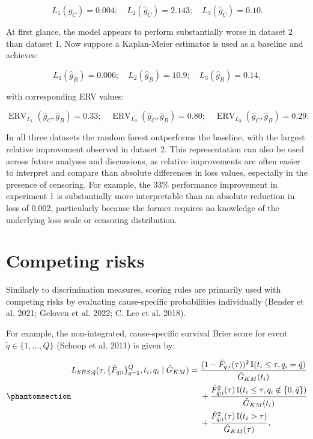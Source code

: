 \documentclass[
  letterpaper,
  krantz2]{style/krantz}
\begin{document}
\[
L_1(\hat{g}_C) = 0.004; \quad L_2(\hat{g}_C) = 2.143; \quad L_3(\hat{g}_C) = 0.10.
\]

At first glance, the model appears to perform substantially worse in
dataset 2 than dataset 1. Now suppose a Kaplan-Meier estimator is used
as a baseline and achieves:

\[
L_1(\hat{g}_B) = 0.006; \quad L_2(\hat{g}_B) = 10.9; \quad L_3(\hat{g}_B) = 0.14,
\]

with corresponding ERV values:

\[
\operatorname{ERV}_{L_1}(\hat{g}_C, \hat{g}_B) = 0.33; \quad \operatorname{ERV}_{L_2}(\hat{g}_C, \hat{g}_B) = 0.80; \quad \operatorname{ERV}_{L_3}(\hat{g}_C, \hat{g}_B) = 0.29.
\]

In all three datasets the random forest outperforms the baseline, with
the largest relative improvement observed in dataset 2. This
representation can also be used across future analyses and discussions,
as relative improvements are often easier to interpret and compare than
absolute differences in loss values, especially in the presence of
censoring. For example, the \(33\%\) performance improvement in
experiment 1 is substantially more interpretable than an absolute
reduction in loss of \(0.002\), particularly because the former requires
no knowledge of the underlying loss scale or censoring distribution.

\section{Competing risks}\label{sec-rules-ext}

Similarly to discrimination measures, scoring rules are primarily used
with competing risks by evaluating cause-specific probabilities
individually (Bender et al. 2021; Geloven et al. 2022; C. Lee et al.
2018).

For example, the non-integrated, cause-specific survival Brier score for
event \(\tilde{q} \in \{1, \ldots, Q\}\) (Schoop et al. 2011) is given
by:

\begin{equation}\phantomsection\label{eq-sbs-cs}{
\begin{aligned}
L_{SBS;\tilde{q}}(\tau, \{\hat{F}_{q;i}\}^Q_{q=1}, t_i, q_i \mid \hat{G}_{KM}) = {} & \frac{(1 - \hat{F}_{\tilde{q};i}(\tau))^2 \, \mathbb{I}(t_i \leq \tau, q_i = \tilde{q})}{\hat{G}_{KM}(t_i)} \\
& + \frac{\hat{F}_{\tilde{q};i}^2(\tau) \, \mathbb{I}(t_i \leq \tau, q_i \notin \{0, \tilde{q}\})}{\hat{G}_{KM}(t_i)} \\
& + \frac{\hat{F}_{\tilde{q};i}^2(\tau) \, \mathbb{I}(t_i > \tau)}{\hat{G}_{KM}(\tau)},
\end{aligned}
}\end{equation}
\end{document}
